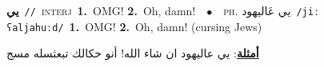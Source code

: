 \documentclass[10pt,a4paper,twoside]{article} %
\begin{document}
\begin{multicols}{2}
{\setlength\topsep{0pt}\textbf{\foreignlanguage{arabic}{يي}}\ {\color{gray}\texttt{//}\color{black}}\ \textsc{interj}\ \textbf{1.}~OMG!  \textbf{2.}~Oh, damn!\ \ $\bullet$\ \ \textsc{ph.} \color{gray} \foreignlanguage{arabic}{يي عَاليهود}\color{black}\ {\color{gray}\texttt{/{\sffamily jiː ʕaljahuːd}/}\color{black}}\ \textbf{1.}~OMG!  \textbf{2.}~Oh, damn! (cursing Jews)\  \begin{flushright}\color{gray}\foreignlanguage{arabic}{\textbf{\underline{\foreignlanguage{arabic}{أمثلة}}}: يي عاليهود ان شاء الله! أنو حكالك تبعثسله مسج}\end{flushright}\color{black}} \vspace{2mm}

\end{multicols}
\end{document}
